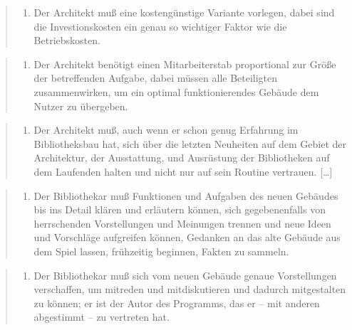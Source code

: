 \documentclass[a4paper,
fontsize=11pt,
oneside,
numbers=noperiodatend,
parskip=half-,
bibliography=totoc,
final
]{scrartcl}
\begin{document}
\begin{quote}
\begin{enumerate}
\def\labelenumi{\arabic{enumi}.}
\setcounter{enumi}{3}
\itemsep1pt\parskip0pt
\item
  Der Architekt muß eine kostengünstige Variante vorlegen, dabei sind
  die Investionskosten ein genau so wichtiger Faktor wie die
  Betriebskosten.
\end{enumerate}
\end{quote}

\begin{quote}
\begin{enumerate}
\def\labelenumi{\arabic{enumi}.}
\setcounter{enumi}{4}
\itemsep1pt\parskip0pt
\item
  Der Architekt benötigt einen Mitarbeiterstab proportional zur Größe
  der betreffenden Aufgabe, dabei müssen alle Beteiligten
  zusammenwirken, um ein optimal funktionierendes Gebäude dem Nutzer zu
  übergeben.
\end{enumerate}
\end{quote}

\begin{quote}
\begin{enumerate}
\def\labelenumi{\arabic{enumi}.}
\setcounter{enumi}{5}
\itemsep1pt\parskip0pt
\item
  Der Architekt muß, auch wenn er schon genug Erfahrung im
  Bibliotheksbau hat, sich über die letzten Neuheiten auf dem Gebiet der
  Architektur, der Ausstattung, und Ausrüstung der Bibliotheken auf dem
  Laufenden halten und nicht nur auf sein Routine vertrauen.
  {[}\ldots{}{]}
\end{enumerate}
\end{quote}

\begin{quote}
\begin{enumerate}
\def\labelenumi{\arabic{enumi}.}
\itemsep1pt\parskip0pt
\item
  Der Bibliothekar muß Funktionen und Aufgaben des neuen Gebäudes bis
  ins Detail klären und erläutern können, sich gegebenenfalls von
  herrschenden Vorstellungen und Meinungen trennen und neue Ideen und
  Vorschläge aufgreifen können, Gedanken an das alte Gebäude aus dem
  Spiel lassen, frühzeitig beginnen, Fakten zu sammeln.
\end{enumerate}
\end{quote}

\begin{quote}
\begin{enumerate}
\def\labelenumi{\arabic{enumi}.}
\setcounter{enumi}{1}
\itemsep1pt\parskip0pt
\item
  Der Bibliothekar muß sich vom neuen Gebäude genaue Vorstellungen
  verschaffen, um mitreden und mitdiskutieren und dadurch mitgestalten
  zu können; er ist der Autor des Programms, das er -- mit anderen
  abgestimmt -- zu vertreten hat.
\end{enumerate}
\end{quote}
\end{document}
